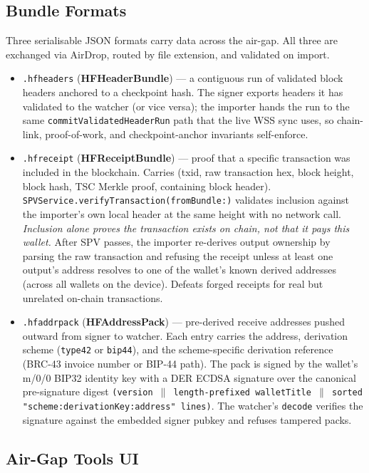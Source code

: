 \documentclass[a4paper, 11pt, openany]{book}
\begin{document}
\subsection{Bundle Formats}

Three serialisable JSON formats carry data across the air-gap. All three are exchanged via AirDrop, routed by file extension, and validated on import.

\begin{itemize}
\item \texttt{.hfheaders} (\textbf{HFHeaderBundle}) --- a contiguous run of validated block headers anchored to a checkpoint hash. The signer exports headers it has validated to the watcher (or vice versa); the importer hands the run to the same \texttt{com\-mit\-Val\-i\-dated\-Head\-er\-Run} path that the live WSS sync uses, so chain-link, proof-of-work, and checkpoint-anchor invariants self-enforce.
\item \texttt{.hfreceipt} (\textbf{HFReceiptBundle}) --- proof that a specific transaction was included in the blockchain. Carries (txid, raw transaction hex, block height, block hash, TSC Merkle proof, containing block header). \texttt{SPV\-Service.verify\-Transaction(from\-Bundle:)} validates inclusion against the importer's own local header at the same height with no network call. \emph{Inclusion alone proves the transaction exists on chain, not that it pays this wallet.} After SPV passes, the importer re-derives output ownership by parsing the raw transaction and refusing the receipt unless at least one output's address resolves to one of the wallet's known derived addresses (across all wallets on the device). Defeats forged receipts for real but unrelated on-chain transactions.
\item \texttt{.hfaddrpack} (\textbf{HFAddressPack}) --- pre-derived receive addresses pushed outward from signer to watcher. Each entry carries the address, derivation scheme (\texttt{type42} or \texttt{bip44}), and the scheme-specific derivation reference (BRC-43 invoice number or BIP-44 path). The pack is signed by the wallet's m/0/0 BIP32 identity key with a DER ECDSA signature over the canonical pre-signature digest \texttt{(version $\|$ length-prefixed walletTitle $\|$ sorted "scheme:derivationKey:address" lines)}. The watcher's \texttt{decode} verifies the signature against the embedded signer pubkey and refuses tampered packs.
\end{itemize}

\subsection{Air-Gap Tools UI}
\end{document}
